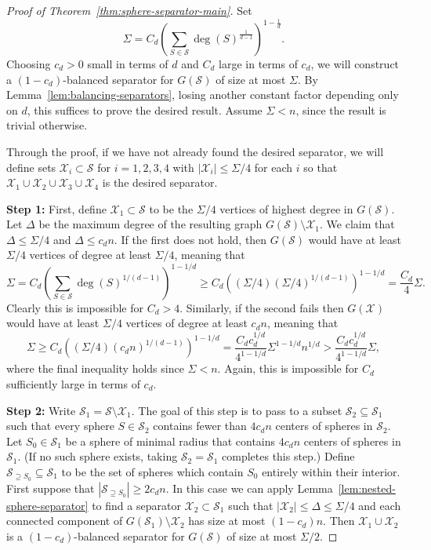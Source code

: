 \documentclass[11pt, reqno]{amsart}
\theoremstyle{plain}
\theoremstyle{definition}
\theoremstyle{remark}
\numberwithin{theorem}{section}
\numberwithin{equation}{section}
\newcommand{\paren}[1]{\left( #1 \right)}
\newcommand{\fS}{\mathcal S}
\newcommand{\fX}{\mathcal X}
\begin{document}
\begin{proof}[Proof of Theorem~\ref{thm:sphere-separator-main}]
Set \[\Sigma=C_d\paren{\sum_{S\in\fS} \deg(S)^{\tfrac1{d-1}}}^{1-\tfrac1d}.\] Choosing $c_d>0$ small in terms of $d$ and $C_d$ large in terms of $c_d$, we will construct a $(1-c_d)$-balanced separator for $G(\fS)$ of size at most $\Sigma$. By Lemma~\ref{lem:balancing-separators}, losing another constant factor depending only on $d$, this suffices to prove the desired result. Assume $\Sigma<n$, since the result is trivial otherwise.

Through the proof, if we have not already found the desired separator, we will define sets $\fX_i \subset \fS$ for $i=1,2,3,4$ with $|\fX_i| \leq \Sigma/4$ for each $i$ so that $\fX_1\cup \fX_2\cup \fX_3\cup \fX_4$ is the desired separator.

\vspace{5pt} \noindent \textbf{Step 1:}
First, define $\fX_1\subset \fS$ to be the $\Sigma/4$ vertices of highest degree in $G(\fS)$. Let $\Delta$ be the maximum degree of the resulting graph $G(\fS)\setminus\fX_1$. We claim that $\Delta\leq\Sigma/4$ and $\Delta\leq c_dn$. If the first does not hold, then $G(\fS)$ would have at least $\Sigma/4$ vertices of degree at least $\Sigma/4$, meaning that
\[\Sigma=C_d\paren{\sum_{S\in\fS} \deg(S)^{1/(d-1)}}^{1-1/d}\geq C_d\paren{(\Sigma/4)(\Sigma/4)^{1/(d-1)}}^{1-1/d}=\frac{C_d}4\Sigma.\]
Clearly this is impossible for $C_d>4$. Similarly, if the second fails then $G(\fX)$ would have at least $\Sigma/4$ vertices of degree at least $c_dn$, meaning that
\[\Sigma\geq C_d\paren{(\Sigma/4)(c_dn)^{1/(d-1)}}^{1-1/d}=\frac{C_dc_d^{1/d}}{4^{1-1/d}}\Sigma^{1-1/d}n^{1/d}>\frac{C_dc_d^{1/d}}{4^{1-1/d}}\Sigma,\]
where the final inequality holds since $\Sigma<n$. Again, this is impossible for $C_d$ sufficiently large in terms of $c_d$.

\vspace{5pt} \noindent \textbf{Step 2:} Write $\fS_1=\fS\setminus \fX_1$. The goal of this step is to pass to a subset $\fS_2\subseteq \fS_1$ such that every sphere $S\in\fS_2$ contains fewer than $4c_dn$ centers of spheres in $\fS_2$. Let $S_0\in\fS_1$ be a sphere of minimal radius that contains $4c_dn$ centers of spheres in $\fS_1$. (If no such sphere exists, taking $\fS_2=\fS_1$ completes this step.) Define $\fS_{\supseteq S_0}\subseteq \fS_1$ to be the set of spheres which contain $S_0$ entirely within their interior. First suppose that $|\fS_{\supseteq S_0}|\geq 2c_dn$. In this case we can apply Lemma~\ref{lem:nested-sphere-separator} to find a separator $\fX_2\subset\fS_1$ such that $|\fX_2|\leq\Delta\leq\Sigma/4$ and each connected component of $G(\fS_1)\setminus\fX_2$ has size at most $(1-c_d)n$. Then $\fX_1\cup\fX_2$ is a $(1-c_d)$-balanced separator for $G(\fS)$ of size at most $\Sigma/2$.


\end{proof}
\end{document}
